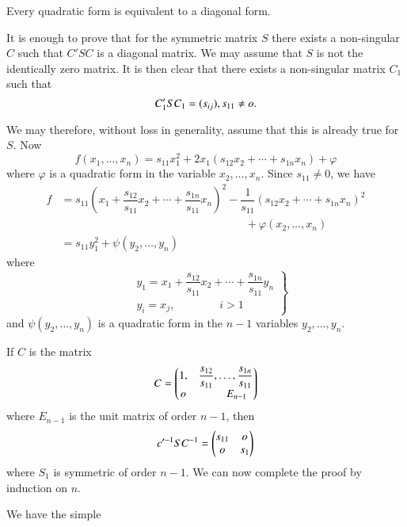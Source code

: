 \begin{prop}\label{prop0}
Every quadratic form is equivalent to a diagonal form.
\end{prop}

\begin{Proof}
It is enough to prove that for the symmetric matrix $S$ there exists a
non-singular $C$ such that $C' S C$ is a diagonal matrix. We may
assume that $S$ is not the identically zero matrix. It is then clear
that there exists a non-singular matrix $C_1$ such that 
$$
C'_1SC_1=(s_{ij}), s_{11} \neq o.
$$

We may therefore, without loss in generality, assume that this is
already true for $S$. Now 
\begin{equation*}
f(x_1,\ldots,x_n)=s_{11}x^{2}_1+2x_1(s_{12}x_2+\cdots+ s_{1n}x_n)+\varphi
\end{equation*}
where $\varphi$ is a quadratic form in the variable
$x_2,\ldots,x_n$. Since $s_{11}\neq 0$, we have
\begin{align*}
f&= s_{11}\left( x_1+\dfrac{s_{12}}{s_{11}} x_2+\cdots+
\dfrac{s_{1n}}{s_{11}} x_n
\right)^{2}-\dfrac{1}{s_{11}}(s_{12}x_{2}+\cdots+
s_{1n}x_n)^{2}\\
&\hspace{7cm}+\varphi(x_2,\ldots,x_n)\\
&= s_{11}y^{2}_1+\psi(y_2,\ldots,y_n)
\end{align*}
where
\begin{equation*}
\left.
\begin{aligned}
& y_1=x_1+\dfrac{s_{12}}{s_{11}} x_2+\cdots+ \dfrac{s_{1n}}{s_{11}}
  y_n\\
& y_i=x_j, \qquad\qquad i>1
\end{aligned}
\right\}
\end{equation*}
and $\psi(y_2,\ldots,y_n)$ is a quadratic form in the $n-1$ variables
$y_2,\ldots,y_n$.

If $C$ is the matrix
\begin{equation*}
C=
\begin{pmatrix}
1, & \dfrac{s_{12}}{s_{11}},\ldots,\dfrac{s_{1n}}{s_{11}}\\
o & \qquad  E_{n-1}
\end{pmatrix}
\end{equation*}
where $E_{n-1}$ is the unit matrix of order $n-1$, then
\begin{equation*}
c'^{-1}SC^{-1}=
\begin{pmatrix}
s_{11} & o\\
o & s_1
\end{pmatrix}
\end{equation*}
where $S_1$ is symmetric of order $n-1$. We can now complete the proof
by induction on $n$. 

We have the simple
\enprf
\end{Proof}


